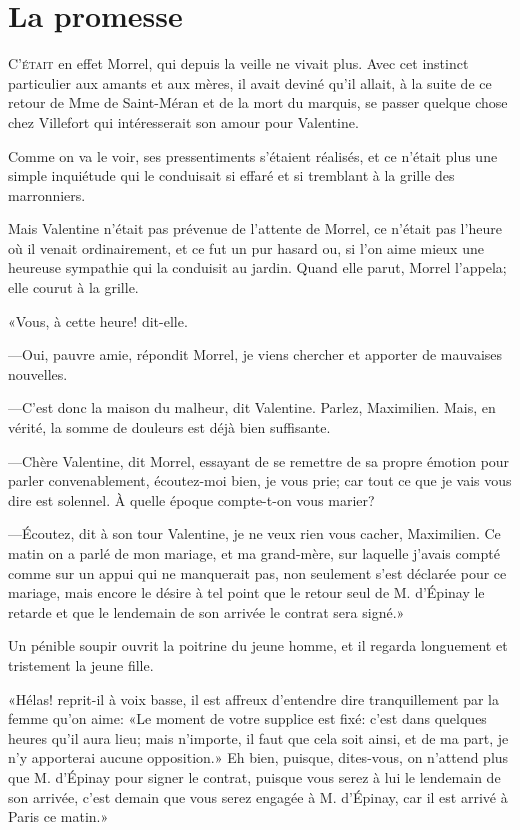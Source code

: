 \chapter{La promesse} 

\lettrine{C}{'était} en effet Morrel, qui depuis la veille ne vivait plus. Avec cet instinct particulier aux amants et aux mères, il avait deviné qu'il allait, à la suite de ce retour de Mme de Saint-Méran et de la mort du marquis, se passer quelque chose chez Villefort qui intéresserait son amour pour Valentine. 

Comme on va le voir, ses pressentiments s'étaient réalisés, et ce n'était plus une simple inquiétude qui le conduisait si effaré et si tremblant à la grille des marronniers. 

Mais Valentine n'était pas prévenue de l'attente de Morrel, ce n'était pas l'heure où il venait ordinairement, et ce fut un pur hasard ou, si l'on aime mieux une heureuse sympathie qui la conduisit au jardin. Quand elle parut, Morrel l'appela; elle courut à la grille. 

«Vous, à cette heure! dit-elle. 

—Oui, pauvre amie, répondit Morrel, je viens chercher et apporter de mauvaises nouvelles. 

—C'est donc la maison du malheur, dit Valentine. Parlez, Maximilien. Mais, en vérité, la somme de douleurs est déjà bien suffisante.  

—Chère Valentine, dit Morrel, essayant de se remettre de sa propre émotion pour parler convenablement, écoutez-moi bien, je vous prie; car tout ce que je vais vous dire est solennel. À quelle époque compte-t-on vous marier? 

—Écoutez, dit à son tour Valentine, je ne veux rien vous cacher, Maximilien. Ce matin on a parlé de mon mariage, et ma grand-mère, sur laquelle j'avais compté comme sur un appui qui ne manquerait pas, non seulement s'est déclarée pour ce mariage, mais encore le désire à tel point que le retour seul de M. d'Épinay le retarde et que le lendemain de son arrivée le contrat sera signé.» 

Un pénible soupir ouvrit la poitrine du jeune homme, et il regarda longuement et tristement la jeune fille. 

«Hélas! reprit-il à voix basse, il est affreux d'entendre dire tranquillement par la femme qu'on aime: «Le moment de votre supplice est fixé: c'est dans quelques heures qu'il aura lieu; mais n'importe, il faut que cela soit ainsi, et de ma part, je n'y apporterai aucune opposition.» Eh bien, puisque, dites-vous, on n'attend plus que M. d'Épinay pour signer le contrat, puisque vous serez à lui le lendemain de son arrivée, c'est demain que vous serez engagée à M. d'Épinay, car il est arrivé à Paris ce matin.» 

